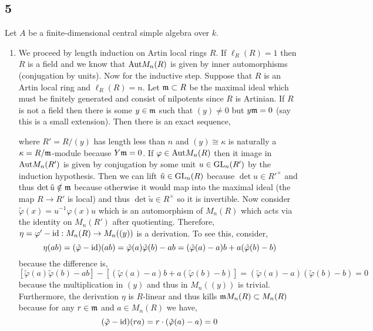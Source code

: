 \documentclass[12pt]{article}
\begin{document}
\subsection{5}


Let $A$ be a finite-dimensional central simple algebra over $k$. 

\begin{enumerate}
\item We proceed by length induction on Artin local rings $R$. If $\ell_R(R) = 1$ then $R$ is a field and we know that $\mathrm{Aut}{M_n(R)}$ is given by inner automorphisms (conjugation by units). Now for the inductive step. Suppose that $R$ is an Artin local ring and $\ell_R(R) = n$. Let $\mathfrak{m} \subset R$ be the maximal ideal which must be finitely generated and consist of nilpotents since $R$ is Artinian. If $R$ is not a field then there is some $y \in \mathfrak{m}$ such that $(y) \neq 0$ but $y \mathfrak{m} = 0$ (say this is a small extension). Then there is an exact sequence,
\begin{center}
\end{center}
where $R' = R / (y)$ has length less than $n$ and $(y) \cong \kappa$ is naturally a $\kappa = R / \mathfrak{m}$-module because $Y \mathfrak{m} = 0$. If $\varphi \in \mathrm{Aut}{M_n(R)}$ then it image in $\mathrm{Aut}{M_n(R')}$ is given by conjugation by some unit $u \in \mathrm{GL}_n(R')$ by the induction hypothesis. Then we can lift $\tilde{u} \in \mathrm{GL}_n(R)$ because $\det{u} \in R'^\times$ and thus $\det{\tilde{u}} \notin \mathfrak{m}$ because otherwise it would map into the maximal ideal (the map $R \to R'$ is local) and thus $\det{\tilde{u}} \in R^\times$ so it is invertible. Now consider $\tilde{\varphi}(x) = u^{-1} \varphi(x) u$ which is an automorphism of $M_n(R)$ which acts via the identity on $M_n(R')$ after quotienting. Therefore, $\eta = \varphi' - \mathrm{id} : M_n(R) \to M_n((y))$ is a derivation. To see this, consider,
\[ \eta(ab) = (\tilde{\varphi} - \mathrm{id})(ab) = \tilde{\varphi}(a) \tilde{\varphi}(b) - ab = (\tilde{\varphi}(a) - a)b + a(\tilde{\varphi}(b) - b) \]
because the difference is,
\[ [\tilde{\varphi}(a) \tilde{\varphi}(b) - ab] - [(\tilde{\varphi}(a) - a)b + a(\tilde{\varphi}(b) - b)] = (\tilde{\varphi}(a) - a)(\tilde{\varphi}(b) - b) = 0 \] 
because the multiplication in $(y)$ and thus in $M_n((y))$ is trivial. 
Furthermore, the derivation $\eta$ is $R$-linear and thus kills $\mathfrak{m} M_n(R) \subset M_n(R)$ because for any $r \in \mathfrak{m}$ and $a \in M_n(R)$ we have,
\[ (\tilde{\varphi} - \mathrm{id})(ra) = r \cdot (\tilde{\varphi}(a) - a) = 0 \]

\end{enumerate}
\end{document}
